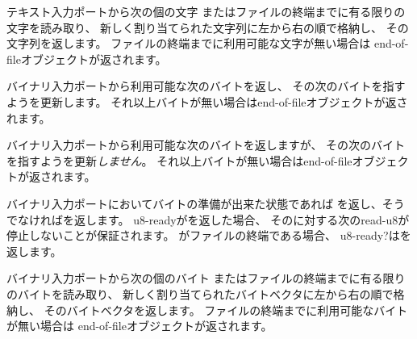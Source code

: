 \begin{entry}{%
}
\label{readstring}

テキスト入力ポートから次の個の文字
またはファイルの終端までに有る限りの文字を読み取り、
新しく割り当てられた文字列に左から右の順で格納し、
その文字列を返します。
ファイルの終端までに利用可能な文字が無い場合は
end-of-fileオブジェクトが返されます。

\end{entry}


\begin{entry}{%
}

バイナリ入力ポートから利用可能な次のバイトを返し、
その次のバイトを指すようを更新します。
それ以上バイトが無い場合はend-of-fileオブジェクトが返されます。

\end{entry}

\begin{entry}{%
}

バイナリ入力ポートから利用可能な次のバイトを返しますが、
その次のバイトを指すようを更新{\em しません}。
それ以上バイトが無い場合はend-of-fileオブジェクトが返されます。

\end{entry}

\begin{entry}{%
}


バイナリ入力ポートにおいてバイトの準備が出来た状態であれば
\schtrue{}を返し、そうでなければ\schfalse{}を返します。
{\cf u8-ready}が\schtrue{}を返した場合、
そのに対する次の{\cf read-u8}が停止しないことが保証されます。
がファイルの終端である場合、
{\cf u8-ready?}は\schtrue{}を返します。

\end{entry}

\begin{entry}{%
}

バイナリ入力ポートから次の個のバイト
またはファイルの終端までに有る限りのバイトを読み取り、
新しく割り当てられたバイトベクタに左から右の順で格納し、
そのバイトベクタを返します。
ファイルの終端までに利用可能なバイトが無い場合は
end-of-fileオブジェクトが返されます。

\end{entry}

